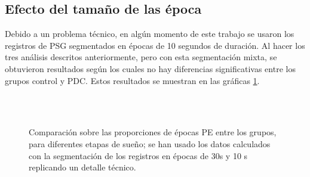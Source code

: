 
\subsection{Efecto del tama\~no de las \'epoca}

Debido a un problema t\'ecnico, en alg\'un momento de este trabajo se usaron los registros
de PSG segmentados en \'epocas de 10 segundos de duraci\'on.
Al hacer los tres an\'alisis descritos anteriormente, pero con esta segmentaci\'on mixta, se 
obtuvieron resultados seg\'un los cuales no hay diferencias significativas entre los grupos
control y PDC. Estos resultados se muestran en las gr\'aficas \ref{comparacion_graf_mixto}.

\begin{figure}
\centering
{}\\
\\
\caption{Comparaci\'on sobre las proporciones de \'epocas PE entre los grupos, para diferentes
etapas de sue\~no; se han usado los datos calculados con la segmentaci\'on de los
registros en \'epocas de 30s y 10 s replicando un detalle t\'ecnico.}
\label{comparacion_graf_mixto}
\end{figure}

